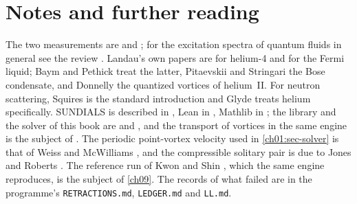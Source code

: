 \section*{Notes and further reading}

The two measurements are \cite{Godfrin2012} and \cite{Godfrin2021}; for the excitation spectra of quantum fluids in general see the review \cite{GodfrinKrotscheck2022}. Landau's own papers are \cite{Landau1941} for helium-4 and \cite{Landau1957} for the Fermi liquid; Baym and Pethick \cite{BaymPethick1991} treat the latter, Pitaevskii and Stringari \cite{PitaevskiiStringari2016} the Bose condensate, and Donnelly \cite{Donnelly1991} the quantized vortices of helium~II. For neutron scattering, Squires \cite{Squires2012} is the standard introduction and Glyde \cite{Glyde1994} treats helium specifically. SUNDIALS is described in \cite{Hindmarsh2005}, Lean in \cite{deMoura2021}, Mathlib in \cite{Mathlib2020}; the library and the solver of this book are \cite{Callens2026lib} and \cite{Callens2026sw}, and the transport of vortices in the same engine is the subject of \cite{Callens2026a}. The periodic point-vortex velocity used in \cref{ch01:sec-solver} is that of Weiss and McWilliams \cite{WeissMcWilliams1991}, and the compressible solitary pair is due to Jones and Roberts \cite{JonesRoberts1982}. The reference run of Kwon and Shin \cite{KwonShin2026prr,KwonShin2026data}, which the same engine reproduces, is the subject of \cref{ch09}. The records of what failed are in the programme's \texttt{RETRACTIONS.md}, \texttt{LEDGER.md} and \texttt{LL.md}.
